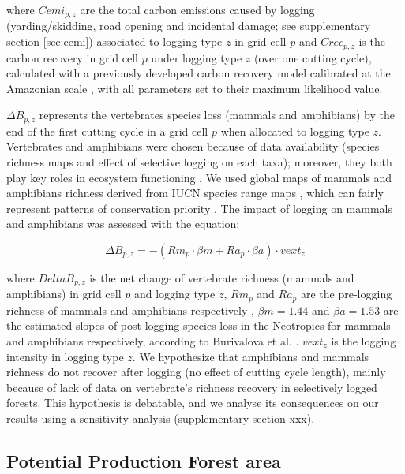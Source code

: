 \documentclass[12pt]{article}
\begin{document}
where $Cemi_{p,z}$ are the total carbon emissions caused by logging (yarding/skidding, road opening and incidental damage; see supplementary section \ref{sec:cemi}) associated to logging type $z$ in grid cell $p$ \cite{Piponiot2016} and $Crec_{p,z}$ is the carbon recovery in grid cell $p$ under logging type $z$ (over one cutting cycle), calculated with a previously developed carbon recovery model calibrated at the Amazonian scale \cite{Piponiot2016a}, with all parameters set to their maximum likelihood value. 

$\Delta B_{p,z}$ represents the vertebrates species loss (mammals and amphibians) by the end of the first cutting cycle in a grid cell $p$ when allocated to logging type $z$. Vertebrates and amphibians were chosen because of data availability (species richness maps and effect of selective logging on each taxa); moreover, they both play key roles in ecosystem functioning \cite{Wright2000,Muscarella2007,Fleming2009,Valencia-Aguilar2013}. 
We used global maps of mammals and amphibians richness derived from IUCN species range maps \cite{Jenkins2013,MapBiodiv}, which can fairly represent patterns of conservation priority \cite{Marechaux2017}.
The impact of logging on mammals and amphibians was assessed with the equation: 

\begin{equation}
\label{eq:rloss}
\Delta B_{p,z} = - \left(Rm_{p} \cdot \beta m + Ra_{p} \cdot \beta a  \right)  \cdot vext_z
\end{equation}

where $Delta B_{p,z}$ is the net change of vertebrate richness (mammals and amphibians) in grid cell $p$ and logging type $z$, $Rm_{p}$ and $Ra_p$ are the pre-logging richness of mammals and amphibians respectively \cite{Jenkins2013}, $\beta m = 1.44$ and $\beta a = 1.53$  are the estimated slopes of post-logging species loss in the Neotropics for mammals and amphibians respectively, according to Burivalova et al. \cite{Burivalova2014}. $vext_z$ is the logging intensity in logging type $z$.
We hypothesize that amphibians and mammals richness do not recover after logging (no effect of cutting cycle length), mainly because of lack of data on vertebrate's richness recovery in selectively logged forests. This hypothesis is debatable, and we analyse its consequences on our results using a sensitivity analysis (supplementary section xxx). 


\subsection*{Potential Production Forest area}
\label{sec:ppf}
\end{document}
